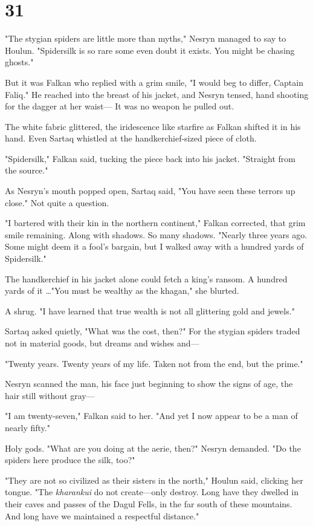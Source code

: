 
\chapter{31}

"The stygian spiders are little more than myths," Nesryn managed to say to Houlun. "Spidersilk is so rare some even doubt it exists. You might be chasing ghosts."

But it was Falkan who replied with a grim smile, "I would beg to differ, Captain Faliq." He reached into the breast of his jacket, and Nesryn tensed, hand shooting for the dagger at her waist--- It was no weapon he pulled out.

The white fabric glittered, the iridescence like starfire as Falkan shifted it in his hand. Even Sartaq whistled at the handkerchief-sized piece of cloth.

"Spidersilk," Falkan said, tucking the piece back into his jacket. "Straight from the source."

As Nesryn's mouth popped open, Sartaq said, "You have seen these terrors up close." Not quite a question.

"I bartered with their kin in the northern continent," Falkan corrected, that grim smile remaining. Along with shadows. So many shadows. "Nearly three years ago. Some might deem it a fool's bargain, but I walked away with a hundred yards of Spidersilk."

The handkerchief in his jacket alone could fetch a king's ransom. A hundred yards of it \ldots"You must be wealthy as the khagan," she blurted.

A shrug. "I have learned that true wealth is not all glittering gold and jewels."

Sartaq asked quietly, "What was the cost, then?" For the stygian spiders traded not in material goods, but dreams and wishes and---

"Twenty years. Twenty years of my life. Taken not from the end, but the prime."

Nesryn scanned the man, his face just beginning to show the signs of age, the hair still without gray---

"I am twenty-seven," Falkan said to her. "And yet I now appear to be a man of nearly fifty."

Holy gods. "What are you doing at the aerie, then?" Nesryn demanded. "Do the spiders here produce the silk, too?"

"They are not so civilized as their sisters in the north," Houlun said, clicking her tongue. "The \emph{kharankui} do not create---only destroy. Long have they dwelled in their caves and passes of the Dagul Fells, in the far south of these mountains. And long have we maintained a respectful distance."


